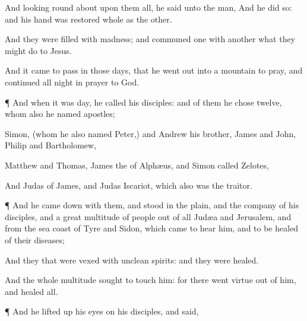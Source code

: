 {And looking round about
upon
them
all, he
said unto the
man,
{}
And he
did
so:
and
his
hand was
restored
whole
as the
other.

And
they were
filled with
madness;
and
communed one
with
another
what they might
do to
Jesus.

And it came to
pass
in
those
days, that he went
out
into a
mountain to
pray,
and continued all
night
in
prayer to
God.


\par }{\PP {}¶
And
when it
was
day, he
called
{}
his
disciples:
and
of
them he
chose
twelve,
whom
also he
named
apostles;

Simon, (whom
he
also
named
Peter,)
and
Andrew
his
brother,
James
and
John,
Philip
and
Bartholomew,

Matthew
and
Thomas,
James
the
{} of
Alphæus,
and
Simon
called
Zelotes,

And
Judas
{} of
James,
and
Judas
Iscariot,
which
also
was the
traitor.


\par }{\PP {}¶
And he came
down
with
them, and
stood
in the
plain,
and the
company of
his
disciples,
and a
great
multitude of
people
out of
all
Judæa
and
Jerusalem,
and from the sea
coast of
Tyre
and
Sidon,
which
came to
hear
him,
and to be
healed
of
their
diseases;

And they that were
vexed
with
unclean
spirits:
and they were
healed.

And the
whole
multitude
sought to
touch
him:
for there
went
virtue
out of
him,
and
healed
{}
all.


\par }{\PP {}¶
And
he lifted
up
his
eyes
on
his
disciples, and
said,
{}




}
